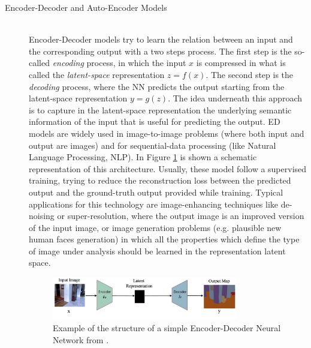 \begin{description}
    \item [Encoder-Decoder and Auto-Encoder Models] \hfill \\
        Encoder-Decoder models try to learn the relation between an input and the corresponding output with a two steps process. The first step is the so-called \textit{encoding} process, in which the input $x$ is compressed in what is called the \textit{latent-space} representation $z = f(x)$. The second step is the \textit{decoding} process, where the NN predicts the output starting from the latent-space representation $ y = g(z)$. The idea underneath this approach is to capture in the latent-space representation the underlying semantic information of the input that is useful for predicting the output. ED models are widely used in image-to-image problems (where both input and output are images) and for sequential-data processing (like Natural Language Processing, NLP). In Figure \ref{fig:EDNN} is shown a schematic representation of this architecture. Usually, these model follow a supervised training, trying to reduce the reconstruction loss between the predicted output and the ground-truth output provided while training. Typical applications for this technology are image-enhancing techniques like de-noising or super-resolution, where the output image is an improved version of the input image, or image generation problems (e.g. plausible new human faces generation) in which all the properties which define the type of image under analysis should be learned in the representation latent space.

        \begin{figure}
            \centering
            \includegraphics[width = 0.8\textwidth]{images/EDnet}
            \caption{Example of the structure of a simple Encoder-Decoder Neural Network from  \cite{deep_seg_SOA}.}
            \label{fig:EDNN}
        \end{figure}


\end{description}
